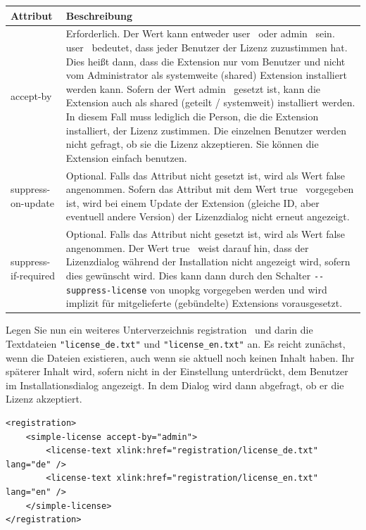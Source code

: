 \documentclass[a4paper,10pt,pagesize,titlepage]{scrbook}
\begin{document}
\begin{tabular}{|p{3.5cm}|p{8.3cm}|}
	\hline \rowcolor{hellgrau} \rule[-3ex]{0pt}{5.5ex}  Attribut & Beschreibung \\
	\hline \rule[-3ex]{0pt}{5.5ex} accept-by & Erforderlich. Der Wert kann entweder \glqq user\grqq~ oder \glqq admin\grqq~ sein. \glqq user\grqq~ bedeutet, dass jeder Benutzer der Lizenz zuzustimmen hat. Dies heißt dann, dass die Extension nur vom Benutzer und nicht vom Administrator als systemweite (shared) Extension installiert werden kann. Sofern der Wert \glqq admin\grqq~ gesetzt ist, kann die Extension auch als shared (geteilt / systemweit) installiert werden. In diesem Fall muss lediglich die Person, die die Extension installiert, der Lizenz zustimmen. Die einzelnen Benutzer werden nicht gefragt, ob sie die Lizenz akzeptieren. Sie können die Extension einfach benutzen.\\
	\hline \rule[-3ex]{0pt}{5.5ex}	suppress-on-update & Optional. Falls das Attribut nicht gesetzt ist, wird als Wert \glqq false\grqq~ angenommen. Sofern das Attribut mit dem Wert \glqq true\grqq~ vorgegeben ist, wird bei einem Update der Extension (gleiche ID, aber eventuell andere Version) der Lizenzdialog nicht erneut angezeigt.\\
	\hline \rule[-3ex]{0pt}{5.5ex}	suppress-if-required & Optional. Falls das Attribut nicht gesetzt ist, wird als Wert \glqq false\grqq~ angenommen. Der Wert \glqq true\grqq~ weist darauf hin, dass der Lizenzdialog während der Installation nicht angezeigt wird, sofern dies gewünscht wird. Dies kann dann durch den Schalter  \verb|--suppress-license| von unopkg vorgegeben werden und wird implizit für mitgelieferte (gebündelte) Extensions vorausgesetzt.\\
	\bottomrule
	
\end{tabular}

\bigskip
\bigskip
Legen Sie nun ein weiteres Unterverzeichnis \glqq registration\grqq~ und darin die Textdateien \verb|"license_de.txt"| und \verb|"license_en.txt"| an. Es reicht zunächst, wenn die Dateien existieren, auch wenn sie aktuell noch keinen Inhalt haben. Ihr späterer Inhalt wird, sofern nicht in der Einstellung unterdrückt, dem Benutzer im Installationsdialog angezeigt. In dem Dialog wird dann abgefragt, ob er die Lizenz akzeptiert.

\begin{lstlisting}
<registration>
    <simple-license accept-by="admin">
        <license-text xlink:href="registration/license_de.txt" lang="de" />
        <license-text xlink:href="registration/license_en.txt" lang="en" />
    </simple-license>
</registration>
\end{lstlisting}
\pagebreak
\end{document}
